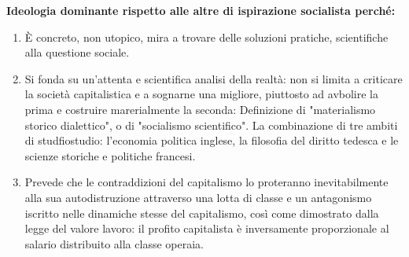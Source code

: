 \documentclass[a4paper]{article}
\begin{document}
\textbf{Ideologia dominante rispetto alle altre di ispirazione socialista perché:}
\begin{enumerate}
    \item È concreto, non utopico, mira  a trovare delle soluzioni pratiche, scientifiche alla questione sociale.
    \item Si fonda su un'attenta e scientifica analisi della realtà: non si limita a criticare la società capitalistica e a sognarne una migliore, piuttosto ad avbolire la prima e costruire marerialmente la seconda:
        Definizione di "materialismo storico dialettico", o di "socialismo scientifico". La combinazione di tre ambiti di studfiostudio: l'economia politica inglese, la filosofia del diritto tedesca e le scienze storiche e politiche francesi.
    \item Prevede che le contraddizioni del capitalismo lo proteranno inevitabilmente alla sua autodistruzione attraverso una lotta di classe e un antagonismo iscritto nelle dinamiche stesse del capitalismo, così come dimostrato dalla legge del valore lavoro: il profito capitalista è inversamente proporzionale al salario distribuito alla classe operaia.
\end{enumerate}
\end{document}
